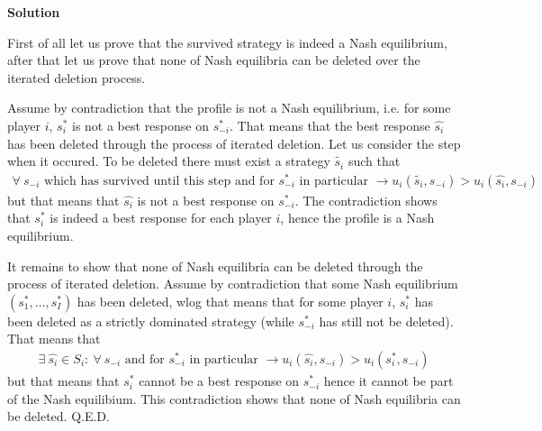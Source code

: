 \documentclass[a4paper]{article}
\begin{document}
\textbf{Solution}


First of all let us prove that the survived strategy is indeed a Nash equilibrium, after that let us prove that none of Nash equilibria can be deleted over the iterated deletion process.


Assume by contradiction that the profile is not a Nash equilibrium, i.e. for some player $i$, $s_i^*$ is not a best response on $s^*_{-i}$. That means that the best response $\hat{s_i}$ has been deleted through the process of iterated deletion. Let us consider the step when it occured. To be deleted there must exist a strategy $\tilde{s_i}$ such that
\begin{align*}
\forall\ s_{-i} \text{ which has survived until this step and for } s^*_{-i} \text{ in particular }\to u_i(\tilde{s_i}, s_{-i}) > u_i(\hat{s_i}, s_{-i})
\end{align*}
but that means that $\hat{s_i}$ is not a best response on $s^*_{-i}$. The contradiction shows that $s^*_{i}$ is indeed a best response for each player $i$, hence the profile is a Nash equilibrium.

It remains to show that none of Nash equilibria can be deleted through the process of iterated deletion. Assume by contradiction that some Nash equilibrium $(s_1^*, \dots, s_I^*)$ has been deleted, wlog that means that for some player $i$, $s_i^*$ has been deleted as a strictly dominated strategy (while $s_{-i}^*$ has still not be deleted). That means that
\begin{align*}
\exists\ \hat{s_i} \in S_i:\ \forall\ s_{-i} \text{ and for } s_{-i}^* \text{ in particular }\to u_i(\hat{s_i}, s_{-i}) > u_i(s_i^*, s_{-i})
\end{align*}
but that means that $s_{i}^*$ cannot be a best response on $s_{-i}^*$ hence it cannot be part of the Nash equilibium. This contradiction shows that none of Nash equilibria can be deleted. Q.E.D.
\end{document}
